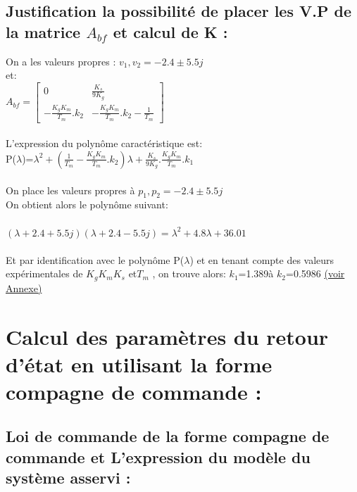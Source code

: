 \subsection{Justification la possibilité de placer les V.P de la matrice $A_{bf}$ et calcul de K :}

On a les valeurs propres : $v_{1},v_{2}=-2.4\pm5.5j$ \\
et:\\
$A_{bf}=
\begin{bmatrix} 
0 & \frac{K_{s}}{9K_{g}} \\
-\frac{K_{g}K_{m}}{T_{m}}.k_{2} & -\frac{K_{g}K_{m}}{T_{m}}.k_{2}-\frac{1}{T_{m}}
\end{bmatrix}$ \\\\

L'expression du polynôme caractéristique est:\\
P($\lambda$)=$\lambda^2+(\frac{1}{T_{m}}-\frac{K_{g}K_{m}}{T_{m}}.k_{2})\lambda+\frac{K_{s}}{9K_{g}}.\frac{K_{g}K_{m}}{T_{m}}.k_{1}$\\\\

On place les valeurs propres à $p_{1},p_{2}=-2.4\pm5.5j$\\

On obtient alors le polynôme suivant: \\\\
$(\lambda+2.4+5.5j)(\lambda+2.4-5.5j)={\lambda}^2+4.8\lambda+36.01$\\\\

Et par identification avec le polynôme P($\lambda$) et en tenant compte des valeurs expérimentales de $K_{g} K_{m} K_{s}$ et$T_{m}$ , on trouve alors:  $k_1$=1.389à \quad $k_2$=0.5986 \hyperref[section1.1]{(voir Annexe)}\label{annexe1}\\



\section{Calcul des paramètres du retour d'état en utilisant la forme compagne de commande :}


\subsection{Loi de commande de la forme compagne de commande et L'expression du modèle du système asservi :  }

